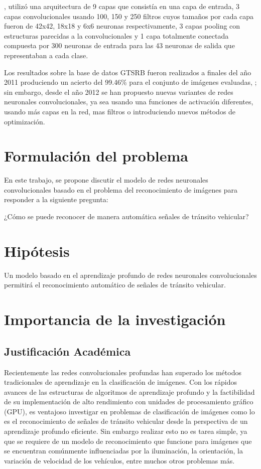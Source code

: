 		\citep{Ciresan}, utilizó una arquitectura de 9 capas que consistía en una capa de entrada, 3 capas convolucionales usando 100, 150 y 250 filtros cuyos tamaños por cada capa fueron de 42x42, 18x18 y 6x6 neuronas respectivamente, 3 capas pooling con estructuras parecidas a la convolucionales y 1 capa totalmente conectada compuesta por 300 neuronas de entrada para las 43 neuronas de salida que representaban a cada clase.
		\vskip 0.4cm

		Los resultados sobre la base de datos GTSRB fueron realizados a finales del año 2011 produciendo un acierto del 99.46\% para el conjunto de imágenes evaluadas, \citep{Stallkamp2012}; sin embargo, desde el año 2012 se han propuesto nuevas variantes de redes neuronales convolucionales, ya sea usando una funciones de activación diferentes, usando más capas en la red, mas filtros o introduciendo nuevos métodos de optimización.


\section{Formulación del problema}

  En este trabajo, se propone discutir el modelo de redes neuronales convolucionales basado en el problema del reconocimiento de imágenes para responder a la siguiente pregunta:
 \begin{center} 
     ¿Cómo se puede reconocer de manera automática señales de tránsito vehicular?
 \end{center}

\section{Hipótesis}
	 Un modelo basado en el aprendizaje profundo de redes neuronales convolucionales permitirá el reconocimiento automático de señales de tránsito vehicular.

\section{Importancia de la investigación} 

	\subsection{Justificación Académica}

	Recientemente las redes convolucionales profundas han superado los métodos tradicionales de aprendizaje en la clasificación de imágenes. Con los rápidos avances de las estructuras de algoritmos de aprendizaje profundo y la factibilidad de su implementación de alto rendimiento con unidades de procesamiento gráfico (GPU), es ventajoso investigar en problemas de clasificación de imágenes como lo es el reconocimiento de señales de tránsito vehicular desde la perspectiva de un aprendizaje profundo eficiente. Sin embargo realizar esto no es tarea simple, ya que se requiere de un modelo de reconocimiento que funcione para imágenes que se encuentran comúnmente influenciadas por la iluminación, la orientación, la variación de velocidad de los vehículos, entre muchos otros problemas más.  \vskip 0.2cm

